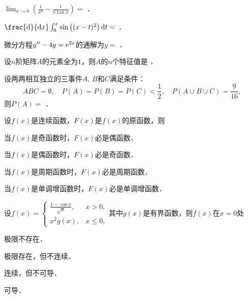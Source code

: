 \documentclass[plain,noanswer,medmath]{../../template/jnuexam}
\begin{document}




\begin{problem}
$\lim_{x \to 0} \left(\frac{1}{x^2} - \frac{1}{x\tan x} \right) =$ \fillin{}．
\end{problem}


\begin{problem}
$\frac{\d}{\dx}\int_0^x \sin \left((x - t)^2 \right)\dt =$ \fillin{}．
\end{problem}


\begin{problem}
微分方程$y''-4y=\mathrm{e}^{2x}$的通解为$y =$ \fillin{}．
\end{problem}


\begin{problem}
设$n$阶矩阵$A$的元素全为$1$，则$A$的$n$个特征值是 \fillin{}．
\end{problem}


\begin{problem}
设两两相互独立的三事件$A$, $B$和$C$满足条件：
$$ABC = \emptyset ,\quad P(A) = P(B) = P(C) < \frac{1}{2},\quad P(A \cup B \cup C) = \frac{9}{16},$$
则$P(A) =$ \fillin{}．
\end{problem}




\begin{problem}
设$f(x)$是连续函数，$F(x)$是$f(x)$的原函数，则\pickout{}
\begin{abcd}
\item 当$f(x)$是奇函数时，$F(x)$必是偶函数．
\item 当$f(x)$是偶函数时，$F(x)$必是奇函数．
\item 当$f(x)$是周期函数时，$F(x)$必是周期函数．
\item 当$f(x)$是单调增函数时，$F(x)$必是单调增函数．
\end{abcd}
\end{problem}


\begin{problem}
设$f(x) = \begin{cases}
  \frac{1 - \cos x}{\sqrt{x}}, & x > 0, \\
  x^2 g(x), & x \le 0,
\end{cases}$其中$g(x)$是有界函数，则$f(x)$在$x = 0$处\pickout{}
\begin{abcd}
\item 极限不存在．
\item 极限存在，但不连续．
\item 连续，但不可导．
\item 可导．
\end{abcd}
\end{problem}
\end{document}
